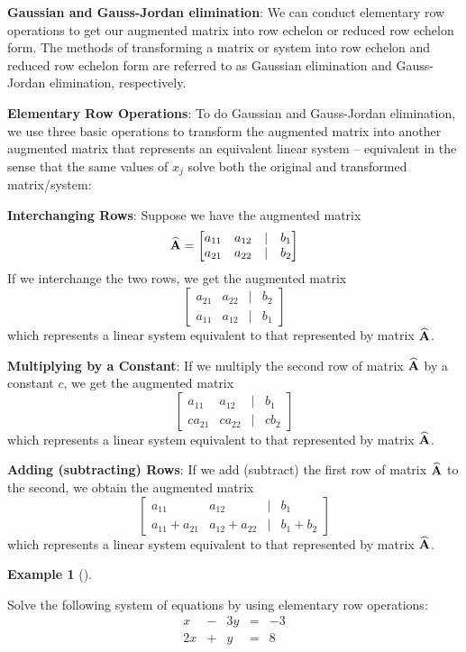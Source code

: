 \documentclass[
  letterpaper,
]{book}
\theoremstyle{definition}
\theoremstyle{definition}
\newtheorem{example}{Example}[chapter]
\theoremstyle{plain}
\theoremstyle{definition}
\theoremstyle{plain}
\theoremstyle{plain}
\theoremstyle{remark}
\begin{document}
\textbf{Gaussian and Gauss-Jordan elimination}: We can conduct
elementary row operations to get our augmented matrix into row echelon
or reduced row echelon form. The methods of transforming a matrix or
system into row echelon and reduced row echelon form are referred to as
Gaussian elimination and Gauss-Jordan elimination, respectively.

\textbf{Elementary Row Operations}: To do Gaussian and Gauss-Jordan
elimination, we use three basic operations to transform the augmented
matrix into another augmented matrix that represents an equivalent
linear system -- equivalent in the sense that the same values of \(x_j\)
solve both the original and transformed matrix/system:

\textbf{Interchanging Rows}: Suppose we have the augmented matrix
\[{\widehat{\bf A}}=\begin{bmatrix} a_{11} & a_{12} & | & b_1\\
        a_{21} & a_{22} & | & b_2 
        \end{bmatrix}\] If we interchange the two rows, we get the
augmented matrix \[\begin{bmatrix}
        a_{21} & a_{22} & | & b_2\\
        a_{11} & a_{12} & | & b_1
        \end{bmatrix}\] which represents a linear system equivalent to
that represented by matrix \(\widehat{\bf A}\).

\textbf{Multiplying by a Constant}: If we multiply the second row of
matrix \(\widehat{\bf A}\) by a constant \(c\), we get the augmented
matrix \[\begin{bmatrix}
        a_{11} & a_{12} & | & b_1\\
        c a_{21} & c a_{22} & | & c b_2
        \end{bmatrix}\] which represents a linear system equivalent to
that represented by matrix \(\widehat{\bf A}\).

\textbf{Adding (subtracting) Rows}: If we add (subtract) the first row
of matrix \(\widehat{\bf A}\) to the second, we obtain the augmented
matrix \[\begin{bmatrix}
        a_{11} & a_{12} & | & b_1\\
        a_{11}+a_{21} & a_{12}+a_{22} & | & b_1+b_2
        \end{bmatrix}\] which represents a linear system equivalent to
that represented by matrix \(\widehat{\bf A}\).

\leavevmode{}%
\begin{example}[]\label{exm-solvesys}

Solve the following system of equations by using elementary row
operations: \[\begin{matrix}
    x  & - & 3y & = & -3\\
    2x & + &  y & = &  8
    \end{matrix}\]

\end{example}
\end{document}
